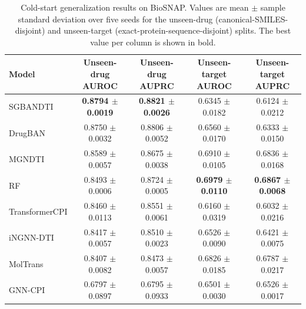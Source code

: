 \documentclass[computers,article,submit,moreauthors]{Definitions/mdpi}
\begin{document}
\begin{table}[H]
\caption{Cold-start generalization results on BioSNAP. Values are mean $\pm$ sample standard deviation over five seeds for the unseen-drug (canonical-SMILES-disjoint) and unseen-target (exact-protein-sequence-disjoint) splits. The best value per column is shown in bold.}
\label{tab:coldstart}
\scriptsize
\setlength{\tabcolsep}{4pt}
\renewcommand{\arraystretch}{1.05}
\begin{tabular*}{\textwidth}{@{\extracolsep{\fill}}lcccc@{}}
\toprule
\textbf{Model} & \textbf{Unseen-drug AUROC} & \textbf{Unseen-drug AUPRC} & \textbf{Unseen-target AUROC} & \textbf{Unseen-target AUPRC} \\
\midrule
SGBANDTI & \textbf{0.8794 $\pm$ 0.0019} & \textbf{0.8821 $\pm$ 0.0026} & 0.6345 $\pm$ 0.0182 & 0.6124 $\pm$ 0.0212 \\
DrugBAN & 0.8750 $\pm$ 0.0032 & 0.8806 $\pm$ 0.0052 & 0.6560 $\pm$ 0.0170 & 0.6333 $\pm$ 0.0150 \\
MGNDTI & 0.8589 $\pm$ 0.0057 & 0.8675 $\pm$ 0.0038 & 0.6910 $\pm$ 0.0105 & 0.6836 $\pm$ 0.0168 \\
RF & 0.8493 $\pm$ 0.0006 & 0.8724 $\pm$ 0.0005 & \textbf{0.6979 $\pm$ 0.0110} & \textbf{0.6867 $\pm$ 0.0068} \\
TransformerCPI & 0.8460 $\pm$ 0.0113 & 0.8551 $\pm$ 0.0061 & 0.6160 $\pm$ 0.0319 & 0.6032 $\pm$ 0.0216 \\
iNGNN-DTI & 0.8417 $\pm$ 0.0057 & 0.8510 $\pm$ 0.0023 & 0.6526 $\pm$ 0.0090 & 0.6421 $\pm$ 0.0075 \\
MolTrans & 0.8407 $\pm$ 0.0082 & 0.8473 $\pm$ 0.0057 & 0.6826 $\pm$ 0.0185 & 0.6787 $\pm$ 0.0217 \\
GNN-CPI & 0.6797 $\pm$ 0.0897 & 0.6795 $\pm$ 0.0933 & 0.6501 $\pm$ 0.0030 & 0.6526 $\pm$ 0.0017 \\
\bottomrule
\end{tabular*}
\end{table}
\end{document}
